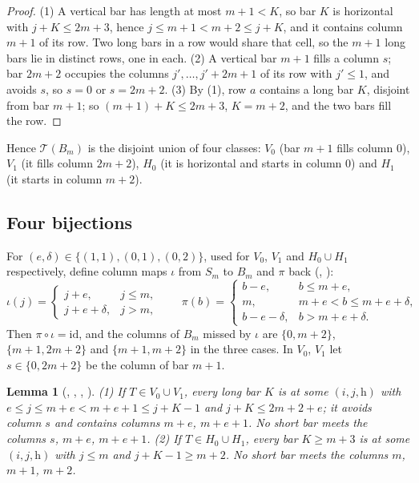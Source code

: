 \documentclass[11pt]{amsart}
\theoremstyle{plain}
\newtheorem{lemma}[theorem]{Lemma}
\theoremstyle{definition}
\newcommand{\T}{\mathcal{T}}
\newcommand{\Sm}{S_m}
\newcommand{\Bm}{B_m}
\begin{document}
\begin{proof}
(1) A vertical bar has length at most $m+1<K$, so bar $K$ is horizontal with $j+K\le2m+3$, hence $j\le m+1<m+2\le j+K$, and it contains column $m+1$ of its row. Two long bars in a row would share that cell, so the $m+1$ long bars lie in distinct rows, one in each. (2) A vertical bar $m+1$ fills a column $s$; bar $2m+2$ occupies the columns $j',\dots,j'+2m+1$ of its row with $j'\le1$, and avoids $s$, so $s=0$ or $s=2m+2$. (3) By (1), row $a$ contains a long bar $K$, disjoint from bar $m+1$; so $(m+1)+K\le2m+3$, $K=m+2$, and the two bars fill the row.
\end{proof}

Hence $\T(\Bm)$ is the disjoint union of four classes: $V_0$ (bar $m+1$ fills column $0$), $V_1$ (it fills column $2m+2$), $H_0$ (it is horizontal and starts in column $0$) and $H_1$ (it starts in column $m+2$).

\subsection{Four bijections}
For $(e,\delta)\in\{(1,1),(0,1),(0,2)\}$, used for $V_0$, $V_1$ and $H_0\cup H_1$ respectively, define column maps $\iota$ from $\Sm$ to $\Bm$ and $\pi$ back (, ):
\[
  \iota(j)=\begin{cases}j+e,&j\le m,\\ j+e+\delta,&j>m,\end{cases}\qquad
  \pi(b)=\begin{cases}b-e,&b\le m+e,\\ m,&m+e<b\le m+e+\delta,\\ b-e-\delta,&b>m+e+\delta.\end{cases}
\]
Then $\pi\circ\iota=\mathrm{id}$, and the columns of $\Bm$ missed by $\iota$ are $\{0,m+2\}$, $\{m+1,2m+2\}$ and $\{m+1,m+2\}$ in the three cases. In $V_0$, $V_1$ let $s\in\{0,2m+2\}$ be the column of bar $m+1$.

\begin{lemma}[, , , ]\label{lem:avoid}
(1) If $T\in V_0\cup V_1$, every long bar $K$ is at some $(i,j,\mathrm h)$ with $e\le j\le m+e<m+e+1\le j+K-1$ and $j+K\le2m+2+e$; it avoids column $s$ and contains columns $m+e$, $m+e+1$. No short bar meets the columns $s$, $m+e$, $m+e+1$. (2) If $T\in H_0\cup H_1$, every bar $K\ge m+3$ is at some $(i,j,\mathrm h)$ with $j\le m$ and $j+K-1\ge m+2$. No short bar meets the columns $m$, $m+1$, $m+2$.
\end{lemma}
\end{document}
